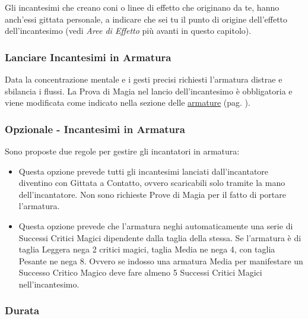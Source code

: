 \begin{multicols}{2}
Gli incantesimi che creano coni o linee di effetto che originano da te, hanno anch'essi gittata personale, a indicare che sei tu il punto di origine dell'effetto dell'incantesimo (vedi \emph{Aree di Effetto} più avanti in questo capitolo).

\subsubsection{Lanciare Incantesimi in Armatura}\label{magielanciareincantesimiinarmatura}

Data la concentrazione mentale e i gesti precisi richiesti l'armatura distrae e sbilancia i flussi. La Prova di Magia nel lancio dell'incantesimo è obbligatoria e viene modificata come indicato nella sezione delle \hyperlink{armatureemagie}{armature} (pag. \pageref{armatureemagie}).

\subsubsection{Opzionale - Incantesimi in Armatura}

Sono proposte due regole per gestire gli incantatori in armatura:

\begin{itemize}[leftmargin=*] \setlength{\itemsep}{0pt}
\item Questa opzione prevede tutti gli incantesimi lanciati dall'incantatore diventino con Gittata a Contatto, ovvero scaricabili solo tramite la mano dell'incantatore. Non sono richieste Prove di Magia per il fatto di portare l'armatura.
\item Questa opzione prevede che l'armatura neghi automaticamente una serie di Successi Critici Magici dipendente dalla taglia della stessa. Se l'armatura è di taglia Leggera nega 2 critici magici, taglia Media ne nega 4, con taglia Pesante ne nega 8. Ovvero se indosso una armatura Media per manifestare un Successo Critico Magico deve fare almeno 5 Successi Critici Magici nell'incantesimo.
\end{itemize}

\subsubsection{Durata}\label{magiedurata}\hypertarget{magiedurata}{}


\end{multicols}
